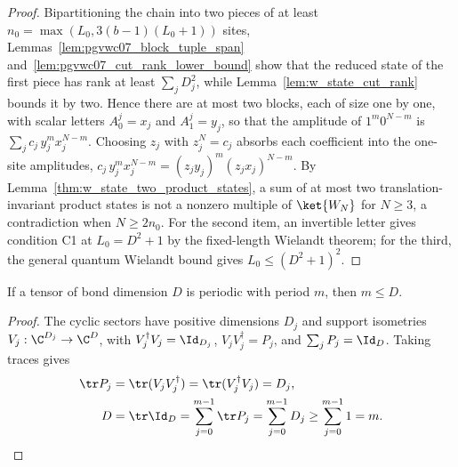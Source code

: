 \begin{proof}
    \leanok
    Bipartitioning the chain into two pieces of at least
    $n_0=\max(L_0,3(b-1)(L_0+1))$ sites,
    Lemmas~\ref{lem:pgvwc07_block_tuple_span}
    and~\ref{lem:pgvwc07_cut_rank_lower_bound} show that the reduced state of
    the first piece has rank at least $\sum_j D_j^2$, while
    Lemma~\ref{lem:w_state_cut_rank} bounds it by two. Hence there are at
    most two blocks, each of size one by one, with scalar letters $A^j_0=x_j$ and
    $A^j_1=y_j$, so that the amplitude of $1^m0^{N-m}$ is
    $\sum_jc_j\,y_j^mx_j^{N-m}$. Choosing $z_j$ with $z_j^N=c_j$ absorbs each
    coefficient into the one-site amplitudes,
    $c_j\,y_j^mx_j^{N-m}=(z_jy_j)^m(z_jx_j)^{N-m}$.
    By Lemma~\ref{thm:w_state_two_product_states}, a sum of at most two
    translation-invariant product states is not a nonzero multiple of
    $\ket{W_N}$ for $N\geq3$, a contradiction when $N\geq2n_0$. For the second
    item, an invertible letter gives condition C1 at $L_0=D^2+1$ by the fixed-length Wielandt theorem; for the third, the general quantum Wielandt bound gives
    $L_0\leq(D^2+1)^2$.
\end{proof}



\begin{lemma}%
    \label{thm:periodic_period_le_bondDim}
    \leanok
    If a tensor of bond dimension $D$ is periodic with period $m$, then $m\leq D$.
\end{lemma}

\begin{proof}
    \leanok
    The cyclic sectors have positive dimensions $D_j$ and support isometries
    $V_j:\C^{D_j}\to\C^D$, with $V_j^\dagger V_j=\Id_{D_j}$,
    $V_jV_j^\dagger=P_j$, and $\sum_jP_j=\Id_D$. Taking traces gives
    \begin{align}
        \tr P_j & =\tr(V_jV_j^\dagger)=\tr(V_j^\dagger V_j)=D_j, \\
        D       & =\tr\Id_D=\sum_{j=0}^{m-1}\tr P_j
        =\sum_{j=0}^{m-1}D_j\geq\sum_{j=0}^{m-1}1=m.
    \end{align}
\end{proof}

